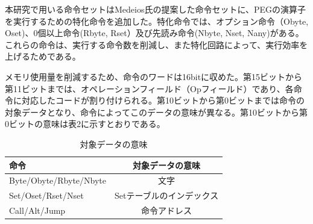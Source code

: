 \documentclass[submit,techrep]{ipsj}
\begin{document}
本研究で用いる命令セットはMedeios氏の提案した命令セットに、PEGの演算子を実行するための特化命令を追加した。特化命令では、オプション命令（Obyte, Oset)、0個以上命令(Rbyte, Rset）及び先読み命令(Nbyte, Nset, Nany)がある。これらの命令は、実行する命令数を削減し、また特化回路によって、実行効率を上げるためである。

メモリ使用量を削減するため、命令のワードは16bitに収めた。第15ビットから第11ビットまでは、オペレーションフィールド（Opフィールド）であり、各命令に対応したコードが割り付けられる。第10ビットから第0ビットまでは命令の対象データとなり、命令によってこのデータの意味が異なる。第10ビットから第0ビットの意味は表2に示すとおりである。

\begin{table}[h]
	\caption{対象データの意味}
	\centering
\begin{tabular}[t]{lc}
	\hline\hline
	 命令 & 対象データの意味 \\\hline
	 Byte/Obyte/Rbyte/Nbyte & 文字 \\
	 Set/Oset/Rset/Nset & Setテーブルのインデックス \\
	 Call/Alt/Jump & 命令アドレス \\\hline
\end{tabular}
\end{table}



\end{document}
